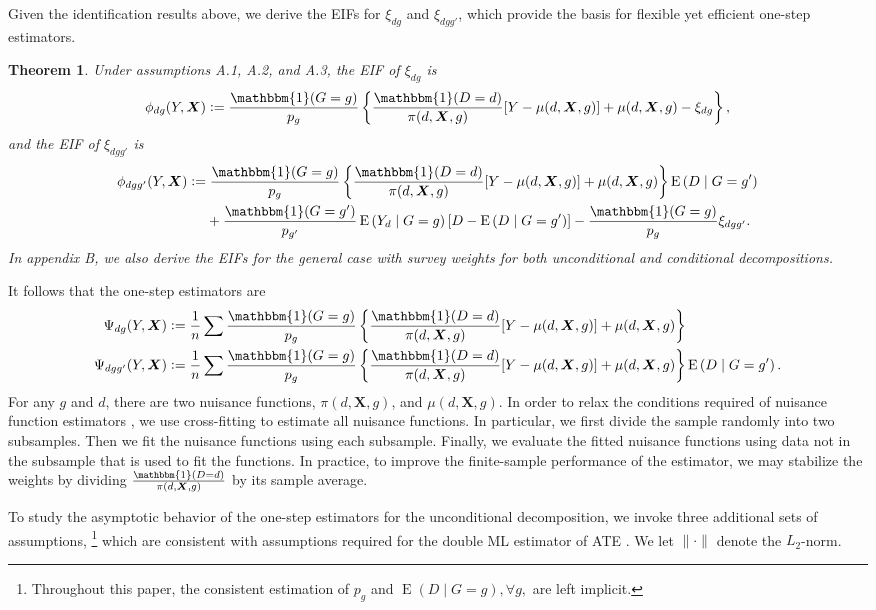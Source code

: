 \documentclass[12pt,a4paper]{article}
\newtheorem{prop}{Theorem}
\newcommand{\E}{\operatorname{E}}
\def\X{{\boldsymbol X}}
\def\one{\mathbbm{1}}
\newcommand{\defeq}{\vcentcolon=}
\begin{document}
Given the identification results above, we derive the EIFs for $\xi_{dg}$ and $\xi_{dgg'}$, which provide the basis for flexible yet efficient one-step estimators.
\begin{prop}
Under assumptions A.1, A.2, and A.3, the EIF of $\xi_{dg}$ is
$$\phi_{dg}(Y,\X) \defeq \frac{\one(G=g)}{p_g} \left\{ \frac{\one(D=d)}{\pi(d, \X,g)} [Y-\mu(d,\X,g)] + \mu(d,\X,g) - \xi_{dg} \right\},$$ 
and the EIF of $\xi_{dgg'}$ is
\begin{align*}
    \phi_{dgg'}(Y,\X) &\defeq \frac{\one(G=g)}{p_g}  \left\{\frac{\one(D=d)}{\pi(d,\X,g)}[Y-\mu(d,\X,g)] + \mu(d,\X,g) \right\} \E \left(D \mid G=g' \right) \\
    &\phantom{{}={}} + \frac{\one(G=g')}{p_{g'}} \E \left(Y_d \mid G=g \right) \left[D - \E \left(D \mid G=g' \right) \right] - \frac{\one(G=g)}{p_g} \xi_{dgg'}.
\end{align*}
In appendix B, we also derive the EIFs for the general case with survey weights for both unconditional and conditional decompositions. 
\end{prop}
It follows that the one-step estimators are
\begin{align*}
    \Psi_{dg}(Y,\X) &\defeq \frac{1}{n} \sum \frac{\one(G=g)}{p_g} \left\{ \frac{\one(D=d)}{\pi(d, \X,g)} [Y-\mu(d,\X,g)] + \mu(d,\X,g)\right\} \\
    \Psi_{dgg'}(Y,\X) &\defeq \frac{1}{n} \sum \frac{\one(G=g)}{p_g}  \left\{\frac{\one(D=d)}{\pi(d,\X,g)}[Y-\mu(d,\X,g)] + \mu(d,\X,g) \right\} \E \left(D \mid G=g' \right).
\end{align*}
For any $g$ and $d$, there are two nuisance functions, $\pi(d,\X,g)$, and $\mu(d,\X,g)$. In order to relax the conditions required of nuisance function estimators \citep{kennedy_semiparametric_2022, chernozhukov_double/debiased_2018}, we use cross-fitting to estimate all nuisance functions. In particular, we first divide the sample randomly into two subsamples. Then we fit the nuisance functions using each subsample. Finally, we evaluate the fitted nuisance functions using data not in the subsample that is used to fit the functions. In practice, to improve the finite-sample performance of the estimator, we may stabilize the weights by dividing $\frac{\one(D=d)}{\pi(d,\X,g)}$ by its sample average.  

To study the asymptotic behavior of the one-step estimators for the unconditional decomposition, we invoke three additional sets of assumptions, \footnote{Throughout this paper, the consistent estimation of $p_g$ and $\E(D \mid G=g), \forall g,$ are left implicit.} which are consistent with assumptions required for the double ML estimator of ATE \citep{kennedy_semiparametric_2022, chernozhukov_double/debiased_2018}. We let $\| \cdot \|$ denote the $L_2$-norm. 
\end{document}
